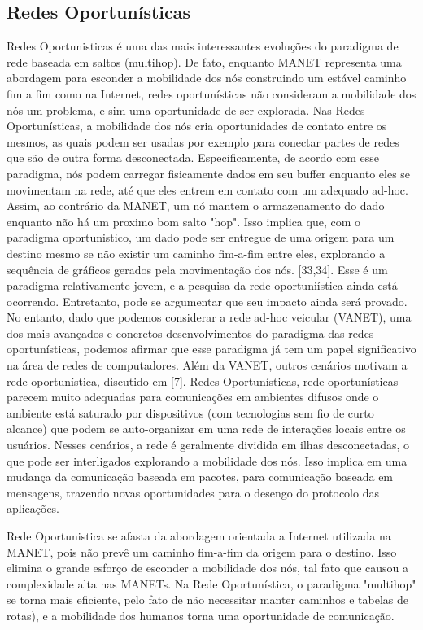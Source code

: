 \documentclass[12pt, %
openright, 
oneside, %
a4paper,    %
brazil]{facom-ufu-abntex2}
\begin{document}
\subsection{Redes Oportunísticas}
Redes Oportunisticas é uma das mais interessantes evoluções do paradigma de rede baseada em saltos (multihop). De fato, enquanto MANET representa uma abordagem para esconder a mobilidade dos nós construindo um estável caminho fim a fim como na Internet, redes oportunísticas não consideram a mobilidade dos nós um problema, e sim uma oportunidade de ser explorada. Nas Redes Oportunísticas, a mobilidade dos nós cria oportunidades de contato entre os mesmos, as quais podem ser usadas por exemplo para conectar partes de redes que são de outra forma desconectada. Especificamente, de acordo com esse paradigma, nós podem carregar fisicamente dados em seu buffer enquanto eles se movimentam na rede, até que eles entrem em contato com um adequado ad-hoc. Assim, ao contrário da MANET, um nó mantem o armazenamento do dado enquanto não há um proximo bom salto "hop". Isso implica que, com o paradigma oportunistico, um dado pode ser entregue de uma origem para um destino mesmo se não existir um caminho fim-a-fim entre eles, explorando a sequência de gráficos gerados pela movimentação dos nós. [33,34]. Esse é um paradigma relativamente jovem, e a pesquisa da rede oportuniística ainda está ocorrendo. Entretanto, pode se argumentar que seu impacto ainda será provado. No entanto, dado que podemos considerar a rede ad-hoc veicular (VANET), uma dos mais avançados e concretos desenvolvimentos do paradigma das redes oportunísticas, podemos afirmar que esse paradigma já tem um papel significativo na área de redes de computadores.
Além da VANET, outros cenários motivam a rede oportunística, discutido em [7]. Redes Oportunísticas, rede oportunísticas parecem muito adequadas para comunicações 
em ambientes difusos onde o ambiente está saturado por dispositivos (com tecnologias sem fio de curto alcance) que podem se auto-organizar em uma rede de interações locais entre os usuários. Nesses cenários, a rede é geralmente dividida em ilhas desconectadas, o que pode ser interligados explorando a mobilidade dos nós. Isso implica em uma mudança da comunicação baseada em pacotes, para comunicação baseada em mensagens, trazendo novas oportunidades para o desengo do protocolo das aplicações. 

Rede Oportunistica se afasta da abordagem orientada a Internet utilizada na MANET, pois não prevê um caminho fim-a-fim da origem para o destino. Isso elimina o grande esforço de esconder a mobilidade dos nós, tal fato que causou a complexidade alta nas MANETs. Na Rede Oportunística, o paradigma "multihop" se torna mais eficiente, pelo fato de não necessitar manter caminhos e tabelas de rotas), e a mobilidade dos humanos torna uma oportunidade de comunicação.
\end{document}
